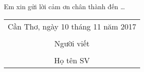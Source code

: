 \documentclass[./thesis.tex]{subfiles}
\begin{document}
Em xin gửi lời cảm ơn chân thành đến \ldots

\hspace*{\fill}
\begin{tabular}{@{}c@{}} 
Cần Thơ, ngày 10 tháng 11 năm 2017\\ \\
Người viết\\ \\
Họ tên SV
\end{tabular}
\end{document}
